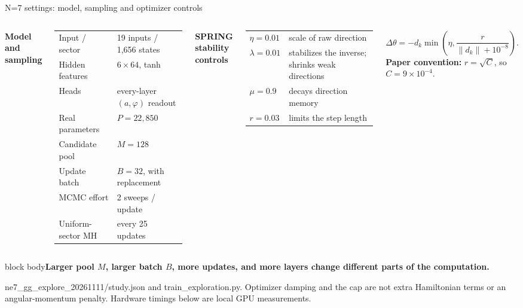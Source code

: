 \documentclass[aspectratio=169,10pt]{beamer}
\newcommand{\src}[1]{\vfill{\fontsize{6.3}{7.5}\selectfont\color{muted}#1\par}}
\newcommand{\take}[1]{\vspace{1mm}\begin{beamercolorbox}[sep=1.6mm,wd=\textwidth]{block body}\small\color{teal}\textbf{#1}\end{beamercolorbox}}
\begin{document}
\begin{frame}{N=7 settings: model, sampling and optimizer controls}
\begin{columns}[T,onlytextwidth]
\textbf{Model and sampling}\par\vspace{2mm}
\small\renewcommand{\arraystretch}{1.2}
\begin{tabular}{@{}ll@{}}\toprule
Input / sector & 19 inputs / 1,656 states\\
Hidden features & $6\times64$, tanh\\
Heads & every-layer $(a,\varphi)$ readout\\
Real parameters & $P=22,850$\\
Candidate pool & $M=128$\\
Update batch & $B=32$, with replacement\\
MCMC effort & 2 sweeps / update\\
Uniform-sector MH & every 25 updates\\\bottomrule
\end{tabular}
\textbf{SPRING stability controls}\par\vspace{2mm}
\small\renewcommand{\arraystretch}{1.2}
\begin{tabular}{@{}lp{.61\linewidth}@{}}\toprule
$\eta=0.01$ & scale of raw direction\\
$\lambda=0.01$ & stabilizes the inverse; shrinks weak directions\\
$\mu=0.9$ & decays direction memory\\
$r=0.03$ & limits the step length\\\bottomrule
\end{tabular}
\[
\Delta\theta=-d_k\min\!\left(\eta,\frac{r}{\|d_k\|+10^{-8}}\right).
\]
\textbf{Paper convention:} $r=\sqrt C$, so $C=9\times10^{-4}$.
\end{columns}
\take{Larger pool $M$, larger batch $B$, more updates, and more layers change different parts of the computation.}
\src{ne7\_gg\_explore\_20261111/study.json and train\_exploration.py. Optimizer damping and the cap are not extra Hamiltonian terms or an angular-momentum penalty. Hardware timings below are local GPU measurements.}
\end{frame}
\end{document}
